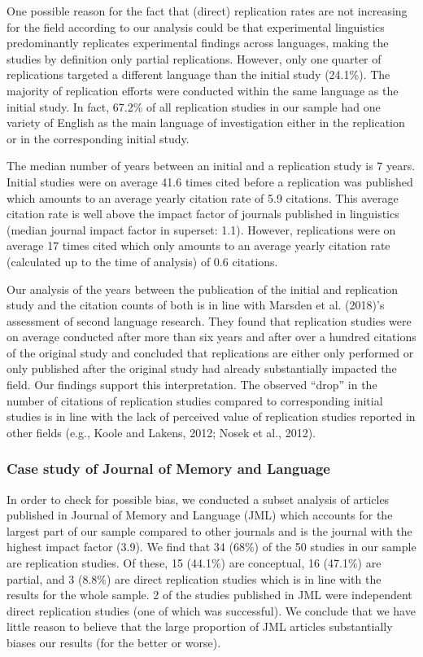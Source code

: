 \documentclass[]{elsarticle} %
\begin{document}
One possible reason for the fact that (direct) replication rates are not increasing for the field according to our analysis could be that experimental linguistics predominantly replicates experimental findings across languages, making the studies by definition only partial replications.
However, only one quarter of replications targeted a different language than the initial study (24.1\%).
The majority of replication efforts were conducted within the same language as the initial study.
In fact, 67.2\% of all replication studies in our sample had one variety of English as the main language of investigation either in the replication or in the corresponding initial study.

The median number of years between an initial and a replication study is 7 years.
Initial studies were on average 41.6 times cited before a replication was published which amounts to an average yearly citation rate of 5.9 citations.
This average citation rate is well above the impact factor of journals published in linguistics (median journal impact factor in superset: 1.1).
However, replications were on average 17 times cited which only amounts to an average yearly citation rate (calculated up to the time of analysis) of 0.6 citations.

Our analysis of the years between the publication of the initial and replication study and the citation counts of both is in line with Marsden et al. (2018)'s assessment of second language research. They found that replication studies were on average conducted after more than six years and after over a hundred citations of the original study and concluded that replications are either only performed or only published after the original study had already substantially impacted the field. Our findings support this interpretation.
The observed ``drop'' in the number of citations of replication studies compared to corresponding initial studies is in line with the lack of perceived value of replication studies reported in other fields (e.g., Koole and Lakens, 2012; Nosek et al., 2012).

\hypertarget{case-study-of-journal-of-memory-and-language}{%
\subsubsection{Case study of Journal of Memory and Language}\label{case-study-of-journal-of-memory-and-language}}

In order to check for possible bias, we conducted a subset analysis of articles published in Journal of Memory and Language (JML) which accounts for the largest part of our sample compared to other journals and is the journal with the highest impact factor (3.9). We find that 34 (68\%) of the 50 studies in our sample are replication studies. Of these, 15 (44.1\%) are conceptual, 16 (47.1\%) are partial, and 3 (8.8\%) are direct replication studies which is in line with the results for the whole sample. 2 of the studies published in JML were independent direct replication studies (one of which was successful). We conclude that we have little reason to believe that the large proportion of JML articles substantially biases our results (for the better or worse).
\end{document}
